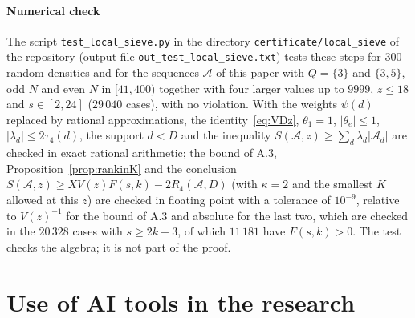 \documentclass[preprint,11pt]{elsarticle}
\theoremstyle{definition}
\theoremstyle{remark}
\newcommand{\cA}{\mathcal{A}}
\numberwithin{equation}{section}
\begin{document}
\paragraph{Numerical check}
The script \texttt{test\_local\_sieve.py} in the directory
\texttt{certificate/local\_sieve} of the repository (output file
\texttt{out\_test\_local\_sieve.txt}) tests these steps for $300$ random densities and for the sequences $\cA$ of
this paper with $Q=\{3\}$ and $\{3,5\}$, odd $N$ and even $N$ in
$[41,400)$ together with four larger values up to $9999$, $z\le18$ and
$s\in[2,24]$ ($29\,040$ cases), with no violation. With the weights
$\psi(d)$ replaced by rational approximations, the identity~\eqref{eq:VDz},
$\theta_1=1$, $|\theta_e|\le1$, $|\lambda_d|\le2\tau_4(d)$, the support
$d<D$ and the inequality $S(\cA,z)\ge\sum_d\lambda_d|\cA_d|$ are checked in
exact rational arithmetic; the bound of A.3, Proposition~\ref{prop:rankinK}
and the conclusion $S(\cA,z)\ge XV(z)F(s,k)-2R_4(\cA,D)$ (with $\kappa=2$
and the smallest $K$ allowed at this $z$) are checked in floating point
with a tolerance of $10^{-9}$, relative to $V(z)^{-1}$ for the bound of
A.3 and absolute for the last two, which are checked in the $20\,328$ cases
with $s\ge2k+3$, of which $11\,181$ have $F(s,k)>0$. The test checks the
algebra; it is not part of the proof.

\section*{Use of AI tools in the research}
\end{document}
